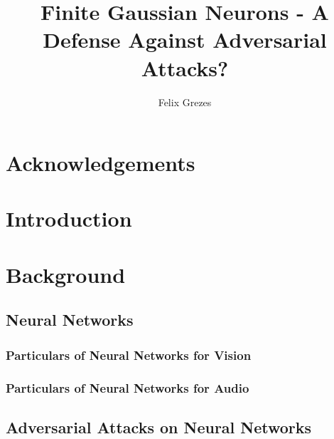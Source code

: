 \documentclass[12pt,oneside]{CUNY_PhD}
\title{Finite Gaussian Neurons - A Defense Against Adversarial Attacks?
}
\author{Felix Grezes}
\begin{document}
\frontmatter

\maketitle %

\makecopyrightpage




\chapter*{Acknowledgements}

\tableofcontents

\mainmatter

\chapter{Introduction}

\chapter{Background}
\section{Neural Networks}
\subsection{Particulars of Neural Networks for Vision}
\subsection{Particulars of Neural Networks for Audio}

\section{Adversarial Attacks on Neural Networks}
\end{document}
